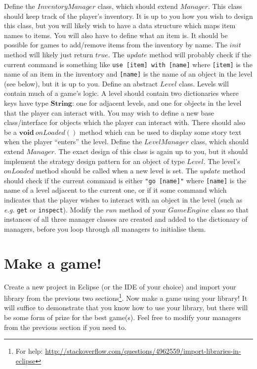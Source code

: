 \documentclass[10pt,a4paper,fleqn]{exam}
\begin{document}
\begin{questions}
\question Define the $\mathit{InventoryManager}$ class, which should extend $\mathit{Manager}$. This class should keep track of the player's inventory. It is up to you how you wish to design this class, but you will likely wish to have a data structure which maps item names to items. You will also have to define what an item is. It should be possible for games to add/remove items from the inventory by name. The $\mathit{init}$ method will likely just return $\mathit{true}$. The $\mathit{update}$ method will probably check if the current command is something like \texttt{use [item] with [name]} where \texttt{[item]} is the name of an item in the inventory and \texttt{[name]} is the name of an object in the level (see below), but it is up to you.
\question Define an abstract $\mathit{Level}$ class. Levels will contain much of a game's logic. A level should contain two dictionaries where keys have type $\mathbf{String}$: one for adjacent levels, and one for objects in the level that the player can interact with. You may wish to define a new base class/interface for objects which the player can interact with. There should also be a $\mathbf{void}~\mathit{onLoaded}()$ method which can be used to display some story text when the player ``enters'' the level.
\question Define the $\mathit{LevelManager}$ class, which should extend $\mathit{Manager}$. The exact design of this class is again up to you, but it should implement the strategy design pattern for an object of type $\mathit{Level}$. The level's $\mathit{onLoaded}$ method should be called when a new level is set. The $\mathit{update}$ method should check if the current command is either \texttt{"go [name]"} where \texttt{[name]} is the name of a level adjacent to the current one, or if it some command which indicates that the player wishes to interact with an object in the level (such as \emph{e.g.} \texttt{get} or \texttt{inspect}).
\question Modify the $\mathit{run}$ method of your $\mathit{GameEngine}$ class so that instances of all three manager classes are created and added to the dictionary of managers, before you loop through all managers to initialise them.

\section{Make a game!}

\question Create a new project in Eclipse (or the IDE of your choice) and import your library from the previous two sections\footnote{For help: \url{http://stackoverflow.com/questions/4962559/import-libraries-in-eclipse}}.
\question Now make a game using your library! It will suffice to demonstrate that you know how to use your library, but there will be some form of prize for the best game(s). Feel free to modify your managers from the previous section if you need to.


\end{questions}
\end{document}
